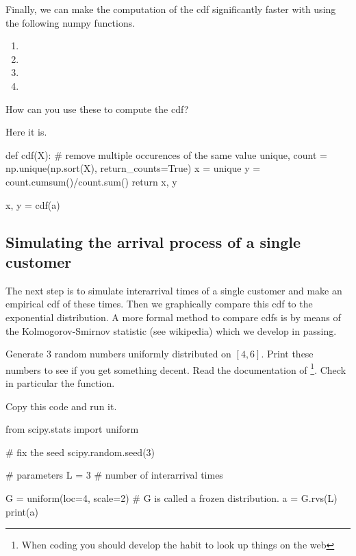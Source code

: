 \documentclass{scrartcl}
\begin{document}
\begin{exercise}
Finally, we can make the computation of the cdf significantly faster with using the following numpy functions. 
\begin{enumerate}
\item {}
\item {}
\item {}
\item {}
\end{enumerate}
How can you use these to compute the cdf?
\begin{solution}
Here it is.
\begin{pyblock}

def cdf(X):
    # remove multiple occurences of the same value
    unique, count = np.unique(np.sort(X), return_counts=True)
    x = unique
    y = count.cumsum()/count.sum()
    return x, y

x, y = cdf(a)
\end{pyblock}

\end{solution}
\end{exercise}

\subsection{Simulating the arrival process of a single customer}
\label{sec:simulations}

The next step is to simulate interarrival times of a single customer and  make an empirical cdf of these times.  Then we graphically compare this cdf to the exponential distribution. A more formal method to compare cdfs is by means of the Kolmogorov-Smirnov statistic (see wikipedia) which we develop in passing.

\begin{exercise}
  Generate 3 random numbers uniformly distributed on $[4,6]$.  Print these numbers to see if you get something decent. Read the documentation of
 \footnote{When coding you should develop the habit to look up things on the web}.  Check in particular the  function. 

\begin{solution}
Copy this code and run it.
\begin{pyverbatim}
from scipy.stats import uniform

# fix the seed
scipy.random.seed(3) 

# parameters
L = 3  # number of interarrival times

G = uniform(loc=4, scale=2) # G is called a frozen distribution.
a = G.rvs(L)
print(a)
\end{pyverbatim}
  
\end{solution}

\end{exercise}
\end{document}
